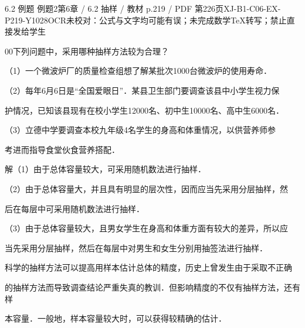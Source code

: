 \begin{bankitem}{6.2 例题 例题2}{第6章 / 6.2 抽样 / 教材 p.219 / PDF 第226页}{XJ-B1-C06-EX-P219-Y1028}{OCR未校对：公式与文字均可能有误；未完成数学TeX转写；禁止直接发给学生}
\begin{ocrdraft}
\par
00下列问题中，采用哪种抽样方法较为合理？
\par
（1）一个微波炉厂的质量检查组想了解某批次1000台微波炉的使用寿命．
\par
（2）每年6月6日是“全国爱眼日”．某县卫生部门要调查该县中小学生视力保
\par
护情况，已知该县现有在校小学生12000名、初中生10000名、高中生6000名．
\par
（3）立德中学要调查本校九年级4名学生的身高和体重情况，以供营养师参
\par
考进而指导食堂伙食营养搭配．
\par
解（1）由于总体容量较大，可采用随机数法进行抽样．
\par
（2）由于总体容量大，并且具有明显的层次性，因而应当先采用分层抽样，然
\par
后在每层中可采用随机数法进行抽样．
\par
（3）由于总体容量较大，且男女学生在身高和体重方面有较大的差异，所以应
\par
当先采用分层抽样，然后在每层中对男生和女生分别用抽签法进行抽样．
\par
科学的抽样方法可以提高用样本估计总体的精度，历史上曾发生由于采取不正确
\par
的抽样方法而导致调查结论严重失真的教训．但影响精度的不仅有抽样方法，还有样
\par
本容量．一般地，样本容量较大时，可以获得较精确的估计．
\end{ocrdraft}
\end{bankitem}
